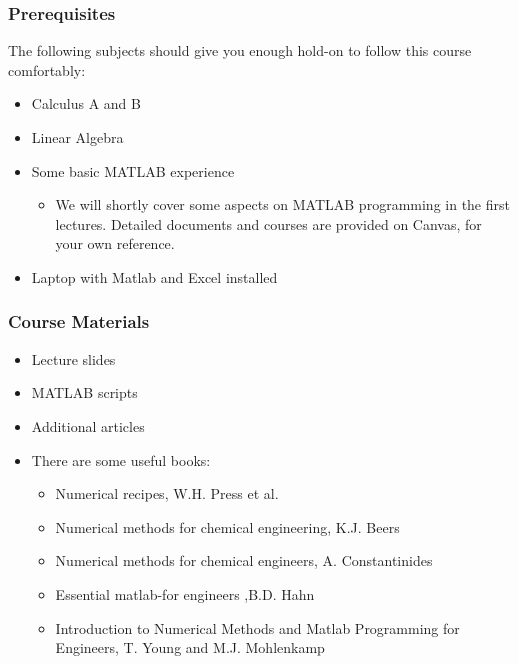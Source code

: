 \documentclass[11pt,table,final,fleqn,xcolor={usenames,dvipsnames},handout]{beamer}
\begin{document}
\begin{frame}
 \frametitle{Prerequisites}
  The following subjects should give you enough hold-on to follow this course comfortably:
 \begin{itemize}
   \item Calculus A and B
   \item Linear Algebra
   \item Some basic MATLAB experience
     \begin{itemize}
       \item We will shortly cover some aspects on MATLAB programming in the first lectures. Detailed documents and courses are provided on Canvas, for your own reference.
     \end{itemize}
   \item Laptop with Matlab and Excel installed
 \end{itemize}
\end{frame}

\begin{frame}
 \frametitle{Course Materials}
 \begin{itemize}
  \item Lecture slides
  \item MATLAB scripts
  \item Additional articles
  \item There are some useful books:
  \begin{itemize}
    \item Numerical recipes, W.H. Press et al.
    \item Numerical methods for chemical engineering, K.J. Beers
    \item Numerical methods for chemical engineers, A. Constantinides
    \item Essential matlab-for engineers ,B.D. Hahn
    \item Introduction to Numerical Methods and Matlab Programming for Engineers, T. Young and M.J. Mohlenkamp
  \end{itemize}
 \end{itemize}
\end{frame}
\end{document}
